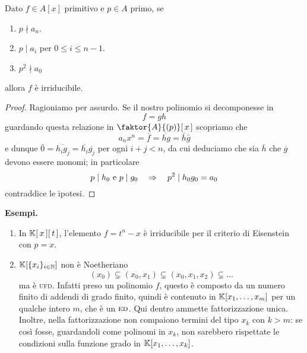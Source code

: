 \begin{multicols}{2}
\begin{theorem}
	Dato $ f \in A[x] $ primitivo e $ p \in A $ primo, se
	\begin{enumerate}
		\item  $ p \nmid a_n $.
		\item $ p \mid a_i $ per $ 0\leq i\leq n-1  $.
		\item $ p^2 \nmid a_0 $
	\end{enumerate}
	allora $ f $ è irriducibile.
\end{theorem}
\begin{proof}
	Ragioniamo per assurdo. Se il nostro polinomio si decomponesse in 
	\[ f = gh \]
	guardando questa relazione in $ \faktor{A}{(p)}[\,x\,] $ scopriamo che
	\[ a_nx^n = \bar{f} = \overline{hg} = \bar{h}\bar{g} \]
	e dunque $ \bar{0} = \overline{h_ig_j} = \overline{h_i}\overline{g_j} $ per ogni $ i+j < n $, da cui deduciamo che sia $ \overline{h} $ che $ \overline{g} $ devono essere monomi; in particolare
	\[ p \mid h_0 \text{ e } p \mid g_0 \quad\Rightarrow\quad p^2 \mid h_0g_0 = a_0 \]
	contraddice le ipotesi.
\end{proof}

\textbf{Esempi.}
\begin{enumerate}
	\item  In $ \mathbb{K}[\,x\,][\,t\,] $, l'elemento $ f = t^n - x $ è irriducibile per il criterio di Eisenstein con $ p = x $. 
	\item $ \mathbb{K}[\{x_i\}_{i \in \mathbb{N}}] $ non è Noetheriano
	\[ (x_0) \subsetneq (x_0, x_1) \subsetneq (x_0, x_1, x_2) \subsetneq \dots  \]
	ma è \textsc{ufd}. Infatti preso un polinomio $ f $, questo è composto da un numero finito di addendi di grado finito, quindi è contenuto in $ \mathbb{K}[x_1, \dots, x_m] $ per un qualche intero $ m $, che è un $ \textsc{ed} $. Qui dentro ammette fattorizzazione unica. Inoltre, nella fattorizzazione non compaiono termini del tipo $ x_k $ con $ k > m $: se così fosse, guardandoli come polinomi in $ x_k $, non sarebbero rispettate le condizioni sulla funzione grado in $ \mathbb{K}[x_1, \dots, x_k] $.
\end{enumerate}


\end{multicols}







